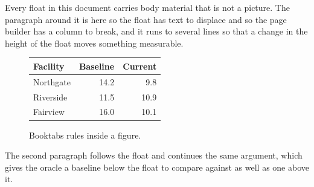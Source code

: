\documentclass{article}
\begin{document}
Every float in this document carries body material that is not a
picture. The paragraph around it is here so the float has text to displace and
so the page builder has a column to break, and it runs to several lines so that
a change in the height of the float moves something measurable.

\begin{figure}[h]
\centering
\begin{tabular}{@{}lrr@{}}
\toprule
Facility & Baseline & Current \\
\midrule
Northgate & 14.2 & 9.8 \\
Riverside & 11.5 & 10.9 \\
Fairview & 16.0 & 10.1 \\
\bottomrule
\end{tabular}
\caption{Booktabs rules inside a figure.}
\end{figure}

The second paragraph follows the float and continues the same
argument, which gives the oracle a baseline below the float to compare against
as well as one above it.
\end{document}
